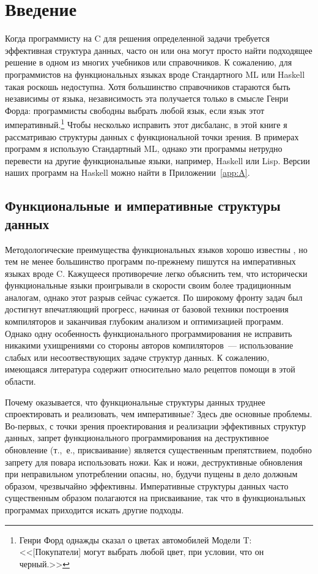 \chapter{Введение}
\label{ch:1}

Когда программисту на C для решения определенной задачи требуется
эффективная структура данных, часто он или она могут просто найти
подходящее решение в одном из многих учебников или справочников. К
сожалению, для программистов на функциональных языках вроде
Стандартного ML или Haskell такая роскошь недоступна.  Хотя большинство
справочников стараются быть независимы от языка, независимость эта
получается только в смысле Генри Форда: программисты свободны выбрать
любой язык, если язык этот императивный.\footnote{%
  Генри Форд однажды сказал о цветах автомобилей Модели T:
  <<[Покупатели] могут выбрать любой цвет, при условии, что он черный.>>
}
Чтобы несколько исправить этот дисбаланс, в этой книге я рассматриваю
структуры данных с функциональной точки зрения. В примерах программ я
использую Стандартный ML, однако эти программы нетрудно перевести на
другие функциональные языки, например, Haskell или Lisp. Версии наших
программ на Haskell можно найти в Приложении~\ref{app:A}.

\section{Функциональные и императивные структуры данных}

Методологические преимущества функциональных языков хорошо известны
\cite{Backus1978,Hughes1989,HudakJones1994}, но тем не менее
большинство программ по-прежнему пишутся на императивных языках вроде
C. Кажущееся противоречие легко объяснить тем, что исторически
функциональные языки проигрывали в скорости своим более традиционным
аналогам, однако этот разрыв сейчас сужается.  По широкому фронту
задач был достигнут впечатляющий прогресс, начиная от базовой техники
построения компиляторов и заканчивая глубоким анализом и оптимизацией
программ.  Однако одну особенность функционального программирования не
исправить никакими ухищрениями со стороны авторов компиляторов~---
использование слабых или несоотвествующих задаче структур данных. К
сожалению, имеющаяся литература содержит относительно мало рецептов
помощи в этой области.

Почему оказывается, что функциональные структуры данных труднее
спроектировать и реализовать, чем императивные? Здесь две основные
проблемы. Во-первых, с точки зрения проектирования и реализации
эффективных структур данных, запрет функционального программирования
на деструктивное обновление (т.,~е., присваивание) является
существенным препятствием, подобно запрету для повара использовать
ножи. Как и ножи, деструктивные обновления при неправильном
употреблении опасны, но, будучи пущены в дело должным образом,
чрезвычайно эффективны.  Императивные структуры данных часто
существенным образом полагаются на присваивание, так что в
функциональных программах приходится искать другие подходы.

